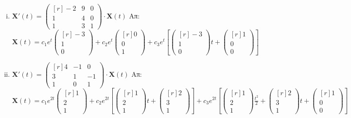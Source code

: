 \begin{enumerate}
\begin{enumerate}[i)]
			\item $ \mathbf{X}'(t) = 
				\begin{pmatrix*}[r]
					-2 & 9 & 0 \\
					1 & 4 & 0 \\
					1 & 3 & 1
				\end{pmatrix*} \cdot 
				\mathbf{X}(t) $
				\hfill Απ: {\scriptsize $ \mathbf{X}(t) = c_{1}e^{t} 
					\begin{pmatrix*}[r] -3 \\ 1 \\ 0 \end{pmatrix*} + c_{2} e^{t}
					\begin{pmatrix*}[r] 0 \\ 0 \\ 1 \end{pmatrix*} + c_{3} e^{t} \left[
					 \begin{pmatrix*}[r] -3 \\ 1 \\ 0 \end{pmatrix*}t +
			 \begin{pmatrix*}[r] 1 \\ 0 \\ 0 \end{pmatrix*} \right] $}

		 \item $ \mathbf{X}'(t) = 
			 \begin{pmatrix*}[r]
				 4 & -1 & 0 \\
				 3 & 1 & -1 \\
				 1 & 0 & 1
			 \end{pmatrix*} \cdot 
			 \mathbf{X}(t)$
			 \hfill Απ: {\scriptsize $ \mathbf{X}(t)= c_{1} e^{2t}
			 \begin{pmatrix*}[r] 1 \\ 2 \\ 1 \end{pmatrix*} + c_{2}e^{2t} \left[ 
		 \begin{pmatrix*}[r] 1 \\ 2 \\ 1 \end{pmatrix*}t + 
 \begin{pmatrix*}[r] 2 \\ 3 \\ 1 \end{pmatrix*} \right] + c_{3}e^{2t} \left[
 \begin{pmatrix*}[r] 1 \\ 2 \\ 1 \end{pmatrix*} \frac{t^{2}}{2} +  
 \begin{pmatrix*}[r] 2 \\ 3 \\ 1 \end{pmatrix*} t + 
 \begin{pmatrix*}[r] 1 \\ 0 \\ 0 \end{pmatrix*}\right]  $} 


\end{enumerate}
\end{enumerate}
